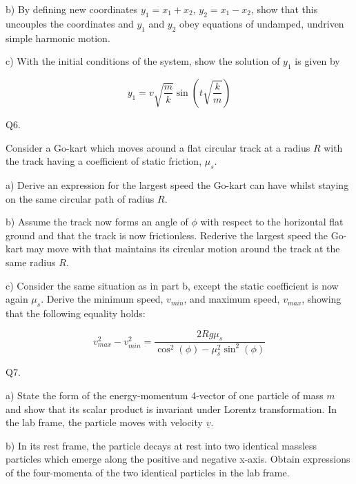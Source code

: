\documentclass[a4paper,11pt]{article}
\begin{document}
\medskip

\noindent b) By defining new coordinates \( y_{1} = x_{1} + x_{2} \), \( y_{2} = x_{1} - x_{2} \), show that this uncouples the coordinates and \( y_{1} \) and \( y_{2} \) obey equations of undamped, undriven simple harmonic motion. 

\medskip

\noindent c) With the initial conditions of the system, show the solution of \( y_{1} \) is given by 

\[
y_{1} = v \sqrt{\frac{m}{k}} \sin(t \sqrt{\frac{k}{m}})
\]

\noindent Q6. 

\noindent Consider a Go-kart which moves around a flat circular track at a radius \( R \) with the track having a coefficient of static friction, \( \mu_{s} \). 

\medskip

\noindent a) Derive an expression for the largest speed the Go-kart can have whilst staying on the same circular path of radius \( R \). 

\medskip

\noindent b) Assume the track now forms an angle of \( \phi \) with respect to the horizontal flat ground and that the track is now frictionless. Rederive the largest speed the Go-kart may move with that maintains its circular motion around the track at the same radius \( R \). 

\medskip

\noindent c) Consider the same situation as in part b, except the static coefficient is now again \( \mu_{s} \). Derive the minimum speed, \( v_{min} \), and maximum speed, \( v_{max} \), showing that the following equality holds:

\[ 
v_{max}^{2} - v_{min}^{2} = \frac{2Rg\mu_{s}}{\cos^{2}(\phi) - \mu_{s}^{2}\sin^{2}(\phi)}
\]

\noindent Q7. 

\noindent a) State the form of the energy-momentum 4-vector of one particle of mass \( m \) and show that its scalar product is invariant under Lorentz transformation. In the lab frame, the particle moves with velocity \( \underline{v} \). 

\medskip

\noindent b) In its rest frame, the particle decays at rest into two identical massless particles which emerge along the positive and negative x-axis. Obtain expressions of the four-momenta of the two identical particles in the lab frame. 
\end{document}
